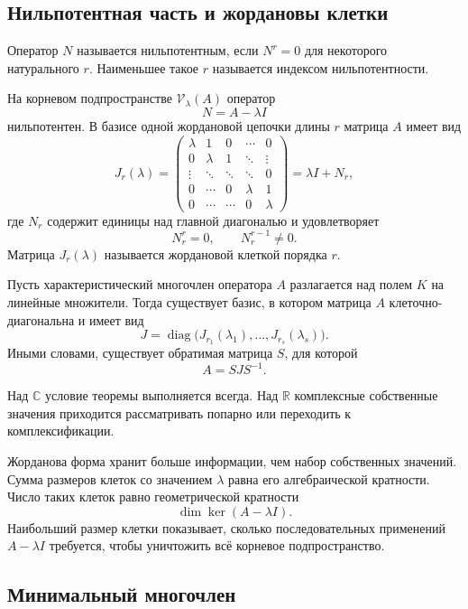 \subsection{Нильпотентная часть и жордановы клетки}

\begin{definition}
Оператор $N$ называется нильпотентным, если $N^r=0$ для некоторого натурального $r$. Наименьшее такое $r$ называется индексом нильпотентности.
\end{definition}

На корневом подпространстве $\mathcal V_\lambda(A)$ оператор
\[
N=A-\lambda I
\]
нильпотентен. В базисе одной жордановой цепочки длины $r$ матрица $A$ имеет вид
\[
J_r(\lambda)
=
\begin{pmatrix}
\lambda&1&0&\cdots&0\\
0&\lambda&1&\ddots&\vdots\\
\vdots&\ddots&\ddots&\ddots&0\\
0&\cdots&0&\lambda&1\\
0&\cdots&\cdots&0&\lambda
\end{pmatrix}
=
\lambda I+N_r,
\]
где $N_r$ содержит единицы над главной диагональю и удовлетворяет
\[
N_r^r=0,
\qquad
N_r^{r-1}\neq0.
\]
Матрица $J_r(\lambda)$ называется жордановой клеткой порядка $r$.

\begin{theorem}
Пусть характеристический многочлен оператора $A$ разлагается над полем $K$ на линейные множители. Тогда существует базис, в котором матрица $A$ клеточно-диагональна и имеет вид
\[
J=
\operatorname{diag}
\bigl(
J_{r_1}(\lambda_1),\dots,J_{r_s}(\lambda_s)
\bigr).
\]
Иными словами, существует обратимая матрица $S$, для которой
\[
A=SJS^{-1}.
\]
\end{theorem}

Над $\mathbb C$ условие теоремы выполняется всегда. Над $\mathbb R$ комплексные собственные значения приходится рассматривать попарно или переходить к комплексификации.

Жорданова форма хранит больше информации, чем набор собственных значений. Сумма размеров клеток со значением $\lambda$ равна его алгебраической кратности. Число таких клеток равно геометрической кратности
\[
\dim\ker(A-\lambda I).
\]
Наибольший размер клетки показывает, сколько последовательных применений $A-\lambda I$ требуется, чтобы уничтожить всё корневое подпространство.

\subsection{Минимальный многочлен}

